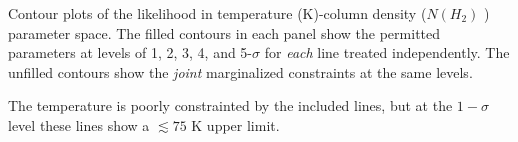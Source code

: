Contour plots of the likelihood in temperature (K)-column
density ($N(H_2)$ \persc) parameter space.  The filled contours in each panel
show the permitted parameters at levels of 1, 2, 3, 4, and 5-$\sigma$ for
\emph{each} line treated independently.  The unfilled contours show the
\emph{joint} marginalized constraints at the same levels.

The temperature is poorly constrainted by the included \cyano lines, but at the
$1-\sigma$ level these lines show a $\lesssim75$ K upper limit.
